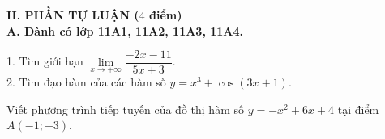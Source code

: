 \noindent\textbf{II. PHẦN TỰ LUẬN ($4$ điểm)}\\
{\bf A. Dành có lớp 11A1, 11A2, 11A3, 11A4.}
\begin{bt}%
	1. Tìm giới hạn $\lim\limits_{x \to + \infty} \dfrac{-2x -11}{5x + 3}$.\\
	2. Tìm đạo hàm của các hàm số $ y = x^3 + \cos (3x + 1)$.
\end{bt}
\begin{bt}%
    Viết phương trình tiếp tuyến của đồ thị hàm số $y = -x^2 + 6x + 4$ tại điểm $A(-1; -3)$.
\end{bt}
